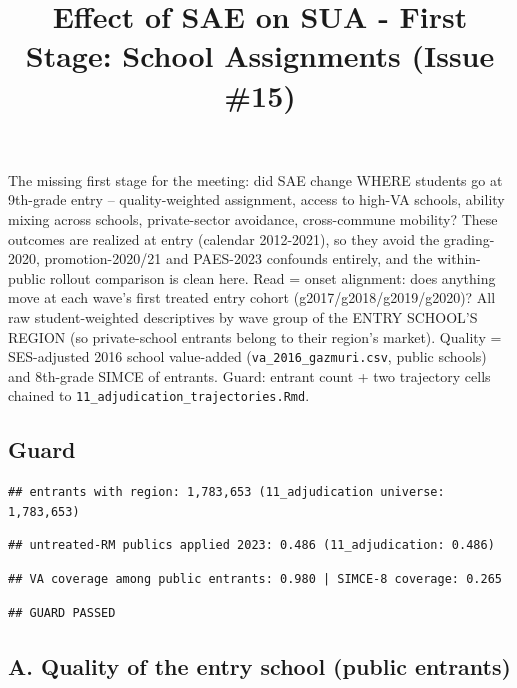 \documentclass[
]{article}
\title{Effect of SAE on SUA - First Stage: School Assignments (Issue
\#15)}
\author{}
\date{\vspace{-2.5em}}
\begin{document}
\maketitle

The missing first stage for the meeting: did SAE change WHERE students
go at 9th-grade entry -- quality-weighted assignment, access to high-VA
schools, ability mixing across schools, private-sector avoidance,
cross-commune mobility? These outcomes are realized at entry (calendar
2012-2021), so they avoid the grading-2020, promotion-2020/21 and
PAES-2023 confounds entirely, and the within-public rollout comparison
is clean here. Read = onset alignment: does anything move at each wave's
first treated entry cohort (g2017/g2018/g2019/g2020)? All raw
student-weighted descriptives by wave group of the ENTRY SCHOOL'S REGION
(so private-school entrants belong to their region's market). Quality =
SES-adjusted 2016 school value-added (\texttt{va\_2016\_gazmuri.csv},
public schools) and 8th-grade SIMCE of entrants. Guard: entrant count +
two trajectory cells chained to
\texttt{11\_adjudication\_trajectories.Rmd}.

\hypertarget{guard}{%
\subsection{Guard}\label{guard}}

\begin{verbatim}
## entrants with region: 1,783,653 (11_adjudication universe: 1,783,653)
\end{verbatim}

\begin{verbatim}
## untreated-RM publics applied 2023: 0.486 (11_adjudication: 0.486)
\end{verbatim}

\begin{verbatim}
## VA coverage among public entrants: 0.980 | SIMCE-8 coverage: 0.265
\end{verbatim}

\begin{verbatim}
## GUARD PASSED
\end{verbatim}

\hypertarget{a.-quality-of-the-entry-school-public-entrants}{%
\subsection{A. Quality of the entry school (public
entrants)}\label{a.-quality-of-the-entry-school-public-entrants}}
\end{document}
